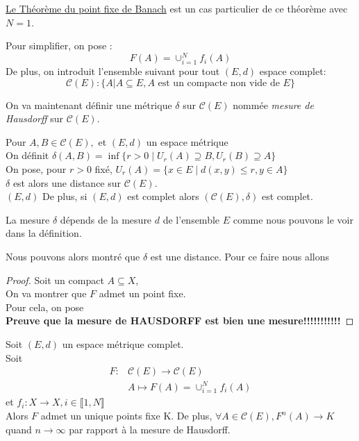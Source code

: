 \documentclass[a4paper, 12pt]{report}
\begin{document}
			\begin{remark*}
			\hyperref[ThmPtFixe]{Le Théorème du point fixe de Banach} est un cas particulier de ce théorème avec $N=1$.
			\end{remark*}
		
			Pour simplifier, on pose :
			\begin{equation*}
				F(A)=\cup^N_{i=1}f_i(A)
			\end{equation*}
			De plus, on introduit l'ensemble suivant pour tout $(E,d)$ espace complet:
			\begin{equation*}
				\mathcal{C}(E) : \{A|A\subseteq E, A\textrm{ est un compacte non vide de }E\}
			\end{equation*}
			
			On va maintenant définir une métrique $\delta$ sur $\mathcal{C}(E)$ nommée \textit{mesure de Hausdorff} sur $\mathcal{C}(E)$.
			\begin{prop}
				\label{mesHauss}
				Pour $A,B\in\mathcal{C}(E),$ et $(E,d)$ un espace métrique\\
				On définit $\delta(A,B)=\inf\{r>0\mid U_r(A)\supseteq B, U_r(B)\supseteq A\}$\\
				On pose, pour $r>0$ fixé, $U_r(A)=\{x\in E\mid d(x,y)\leq r,y\in A\}$\\
				$\delta$ est alors une distance sur $\mathcal{C}(E)$.\\$(E,d)$
				De plus, si $(E,d)$ est complet alors $(\mathcal{C}(E),\delta)$ est complet.
			\end{prop}
			\begin{remark*}
				La mesure $\delta$ dépends de la mesure $d$ de l'ensemble $E$ comme nous pouvons le voir dans la définition. 
			\end{remark*}

			
			Nous pouvons alors montré que $\delta$ est une distance. Pour ce faire nous allons 
			\begin{proof}
				Soit un compact $A\subseteq X$,\\
				On va montrer que $F$ admet un point fixe.\\
				Pour cela, on pose \\
				\textbf{Preuve que la mesure de HAUSDORFF est bien une mesure!!!!!!!!!!!}
			\end{proof}
			
			\begin{theorem}
			\label{ThmConverge}
				Soit $(E,d)$ un espace métrique complet.\\
				Soit 
				\begin{align*}
					F:&\mathcal{C}(E)\longrightarrow \mathcal{C}(E)\\
					&A\longmapsto F(A)=\cup^N_{i=1}f_i(A)
				\end{align*}
				et $f_i:X \longrightarrow X, i\in\llbracket 1,N\rrbracket$\\
				Alors $F$ admet un unique points fixe K. De plus, $\forall A\in\mathcal{C}(E), F^n(A)\longrightarrow K$ quand ${n\to\infty}$ par rapport à la mesure de Hausdorff.
			\end{theorem}
\end{document}
